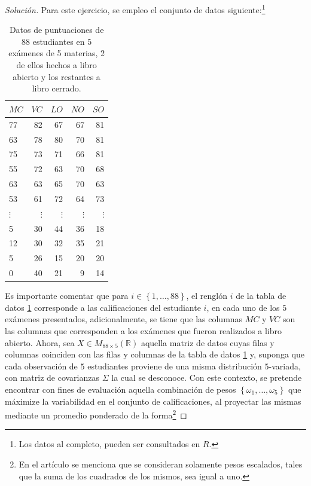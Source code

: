 \documentclass[10.5pt,notitlepage]{article}
\newenvironment{solucion}
  {\begin{proof}[Solución]}
  {\end{proof}}
\newcommand{\RR}{\mathbb{R}}
\newcommand{\kis}[1]{\left\{ #1 \right\}}
\theoremstyle{plain}
\begin{document}
\begin{solucion}
Para este ejercicio, se empleo el conjunto de datos siguiente:\footnote{Los datos al completo, pueden ser consultados en \(R\).}
\begin{table}[H]
        \centering
        \begin{tabular}{@{}l@{\hskip 0.3in}r@{\hskip 0.3in}r@{\hskip 0.3in}r@{\hskip 0.3in}r@{}}
        \toprule
        \(MC\)&  \(VC\)&  \(LO\)&  \(NO\)&  \(SO\)\\ 
        \midrule          
        77&  82&  67&  67&  81\\
        63&  78&  80&  70&  81\\
        75&  73&  71&  66&  81\\
        55&  72&  63&  70&  68\\
        63&  63&  65&  70&  63\\
        53&  61&  72&  64&  73\\
        \(\vdots\)& \(\vdots\)& \(\vdots\)& \(\vdots\)& \(\vdots\)\\
        5&  30&  44&  36&  18\\
        12&  30&  32&  35&  21\\
        5&  26&  15&  20&  20\\
        0&  40&  21&  9&  14\\
        \end{tabular}
        \caption{Datos de puntuaciones de 88 estudiantes en \(5\) exámenes de 5 materias, 2 de ellos hechos a libro abierto y los restantes a libro cerrado.}
        \label{tab:1}
\end{table}
Es importante comentar que para \(i \in \kis{1, \hdots, 88}\), el renglón \(i\) de la tabla de datos \ref{tab:1} corresponde a las calificaciones del estudiante \(i\), en cada uno de los \(5\) exámenes presentados, adicionalmente, se tiene que las columnas \(MC\) y \(VC\) son las columnas que corresponden a los exámenes que fueron realizados a libro abierto. Ahora, sea \(X \in M_{88 \times 5}(\RR)\) aquella matriz de datos cuyas filas y columnas coinciden con las filas y columnas de la tabla de datos \ref{tab:1} y, suponga que cada observación de \(5\) estudiantes proviene de una misma distribución \(5\)-variada, con matriz de covarianzas \(\Sigma\) la cual se desconoce. Con este contexto, se pretende encontrar con fines de evaluación aquella combinación de pesos \(\kis{\omega_1, \hdots, \omega_5}\) que máximize la variabilidad en el conjunto de calificaciones, al proyectar las mismas mediante un promedio ponderado de la forma\footnote{En el artículo se menciona que se consideran solamente pesos escalados, tales que la suma de los cuadrados de los mismos, sea igual a uno.}

\end{solucion}
\end{document}
